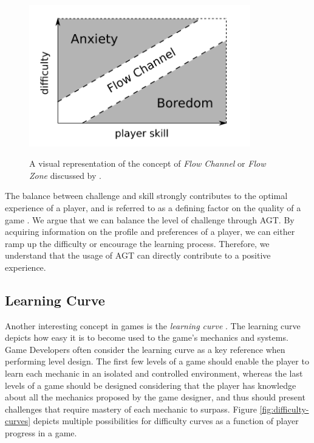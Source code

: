 \begin{figure}
    \begin{center}
    \caption{A visual representation of the concept of \emph{Flow Channel} or \emph{Flow Zone} discussed by \citet{BOOK_Flow}.}
        \includegraphics[width=26em]{figures/fig-flow-channel.png}
        \label{fig:flow-channel}
    \end{center}
\end{figure}

The balance between challenge and skill strongly contributes to the optimal experience of a player, and is referred to as a defining factor on the quality of a game \cite{ARTICLE_FearOfFailure}. We argue that we can balance the level of challenge through AGT. By acquiring information on the profile and preferences of a player, we can either ramp up the difficulty or encourage the learning process. Therefore, we understand that the usage of AGT can directly contribute to a positive experience.

\subsection{Learning Curve}
\label{sec:learning-curve}

Another interesting concept in games is the \emph{learning curve} \cite{article_learningcurve}. The learning curve depicts how easy it is to become used to the game's mechanics and systems. Game Developers often consider the learning curve as a key reference when performing level design. The first few levels of a game should enable the player to learn each mechanic in an isolated and controlled environment, whereas the last levels of a game should be designed considering that the player has knowledge about all the mechanics proposed by the game designer, and thus should present challenges that require mastery of each mechanic to surpass. Figure \ref{fig:difficulty-curves} depicts multiple possibilities for difficulty curves as a function of player progress in a game.

